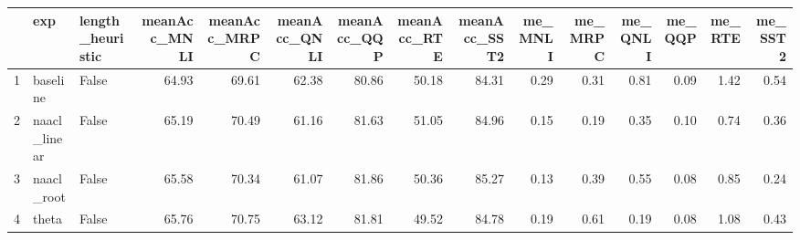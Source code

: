 \begin{table}[ht]
\centering
\begin{tabular}{rllrrrrrrrrrrrr}
  \hline
 & exp & length\_heuristic & meanAcc\_MNLI & meanAcc\_MRPC & meanAcc\_QNLI & meanAcc\_QQP & meanAcc\_RTE & meanAcc\_SST2 & me\_MNLI & me\_MRPC & me\_QNLI & me\_QQP & me\_RTE & me\_SST2 \\ 
  \hline
1 & baseline & False & 64.93 & 69.61 & 62.38 & 80.86 & 50.18 & 84.31 & 0.29 & 0.31 & 0.81 & 0.09 & 1.42 & 0.54 \\ 
  2 & naacl\_linear & False & 65.19 & 70.49 & 61.16 & 81.63 & 51.05 & 84.96 & 0.15 & 0.19 & 0.35 & 0.10 & 0.74 & 0.36 \\ 
  3 & naacl\_root & False & 65.58 & 70.34 & 61.07 & 81.86 & 50.36 & 85.27 & 0.13 & 0.39 & 0.55 & 0.08 & 0.85 & 0.24 \\ 
  4 & theta & False & 65.76 & 70.75 & 63.12 & 81.81 & 49.52 & 84.78 & 0.19 & 0.61 & 0.19 & 0.08 & 1.08 & 0.43 \\ 
   \hline
\end{tabular}
\end{table}

